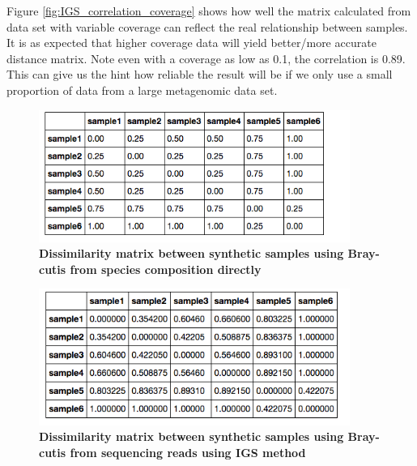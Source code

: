 \documentclass{article}
\begin{document}
Figure \ref{fig:IGS_correlation_coverage} shows how well the matrix calculated from data set with variable coverage can 
reflect the real relationship between samples. It is as expected that higher coverage data will yield better/more accurate distance matrix.
Note even with a coverage as low as 0.1, the correlation is 0.89. This can  give us the hint how reliable the result will be if 
we only use a small proportion of data from a large metagenomic data set.



\begin{figure}[!ht]
 \centerline{\includegraphics[width=4in]{./figures/simulated_real_matrix.png}}
\caption{\bf Dissimilarity matrix between synthetic samples using Bray-cutis from species composition directly }
\label{fig:simulated_real_matrix}
\end{figure}


\begin{figure}[!ht]
 \centerline{\includegraphics[width=4in]{./figures/simulated_matrix1.png}}
\caption{\bf Dissimilarity matrix between synthetic samples using Bray-cutis from sequencing reads using IGS method }
\label{fig:simulated_matrix1}
\end{figure}
\end{document}
